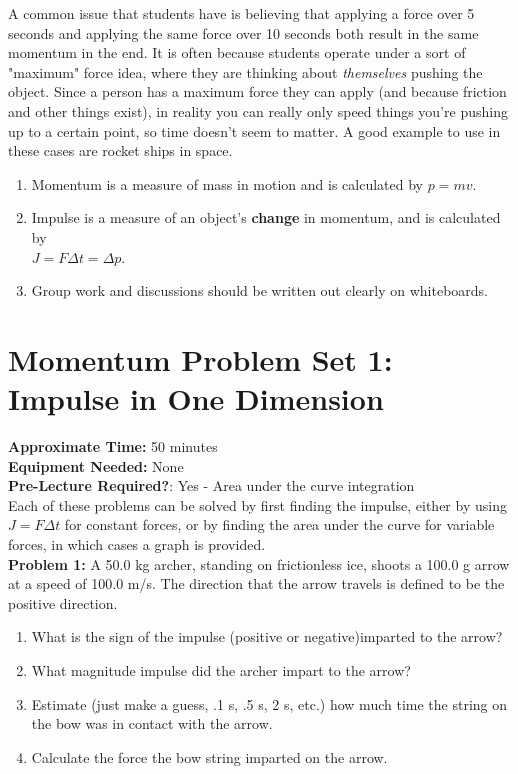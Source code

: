 \begin{tutorialbox}[title=Student Issue 1: Forces over Time]
A common issue that students have is believing that applying a force
over 5 seconds and applying the same force over 10 seconds both result in the same 
momentum in the end.  It is often because students operate under a sort of "maximum" 
force idea, where they are thinking about \textit{themselves} pushing the object.
Since a person has a maximum force they can apply (and because friction and other things
exist), in reality you can really only speed things you're pushing up to a certain point, 
so time doesn't seem to matter. A good example to use in these cases are rocket ships in space.
\end{tutorialbox}

\begin{problembox}[title=Learning Outcomes: Oomph]
\begin{enumerate}[label=(\alph*)]
    \item Momentum is a measure of mass in motion and is calculated by $p = mv$.
    \item Impulse is a measure of an object's \textbf{change} in momentum, and is calculated by \\ $J = F \Delta t = \Delta p$.
    \item Group work and discussions should be written out clearly on whiteboards.
\end{enumerate}
\end{problembox}

\newpage
\section{Momentum Problem Set 1: Impulse in One Dimension}
\textbf{Approximate Time:} 50 minutes \\
\textbf{Equipment Needed:} None \\
\textbf{Pre-Lecture Required?}: Yes - Area under the curve integration\\

Each of these problems can be solved by first finding the impulse, either by using
$J = F \Delta t$ for constant forces, or by finding the area under the curve for variable forces, 
in which cases a graph is provided.\\


\noindent
\textbf{Problem 1:} A 50.0 kg archer, standing on frictionless ice, shoots a 100.0 g 
arrow at a speed of 100.0 m/s. The direction that the arrow travels is defined to 
be the positive direction.
\begin{enumerate}[label=(\alph*)]
    \item What is the sign of the impulse (positive or negative)imparted to the arrow?
    \item What magnitude impulse did the archer impart to the arrow?
    \item Estimate (just make a guess, .1 s, .5 s, 2 s, etc.) how much time the string on the bow was in contact with the arrow.
    \item Calculate the force the bow string imparted on the arrow.
\end{enumerate}

